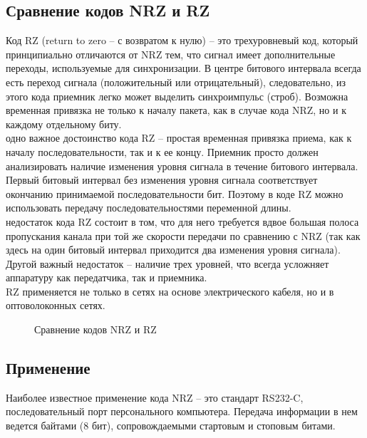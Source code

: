 \documentclass[a4paper14pt]{article}
\begin{document}
\subsection{Сравнение кодов NRZ и RZ}
Код RZ (return to zero – с возвратом к нулю) – это трехуровневый код, который принципиально отличаются от NRZ тем, что сигнал имеет дополнительные переходы, используемые для синхронизации. В центре битового интервала всегда есть переход сигнала (положительный или отрицательный), следовательно, из этого кода приемник легко может выделить синхроимпульс (строб). Возможна временная привязка не только к началу пакета, как в случае кода NRZ, но и к каждому отдельному биту.\\
 одно важное достоинство кода RZ – простая временная привязка приема, как к началу последовательности, так и к ее концу. Приемник просто должен анализировать наличие изменения уровня сигнала в течение битового интервала. Первый битовый интервал без изменения уровня сигнала соответствует окончанию принимаемой последовательности бит. Поэтому в коде RZ можно использовать передачу последовательностями переменной длины.\\
 недостаток кода RZ состоит в том, что для него требуется вдвое большая полоса пропускания канала при той же скорости передачи по сравнению с NRZ (так как здесь на один битовый интервал приходится два изменения уровня сигнала). Другой важный недостаток – наличие трех уровней, что всегда усложняет аппаратуру как передатчика, так и приемника.\\
 RZ применяется не только в сетях на основе электрического кабеля, но и в оптоволоконных сетях. \\
\begin{figure}[h]
    \caption{Сравнение кодов NRZ и RZ}
\end{figure}
\subsection{Применение}
Наиболее известное применение кода NRZ – это стандарт RS232-C, последовательный порт персонального компьютера. Передача информации в нем ведется байтами (8 бит), сопровождаемыми стартовым и стоповым битами.
\end{document}
